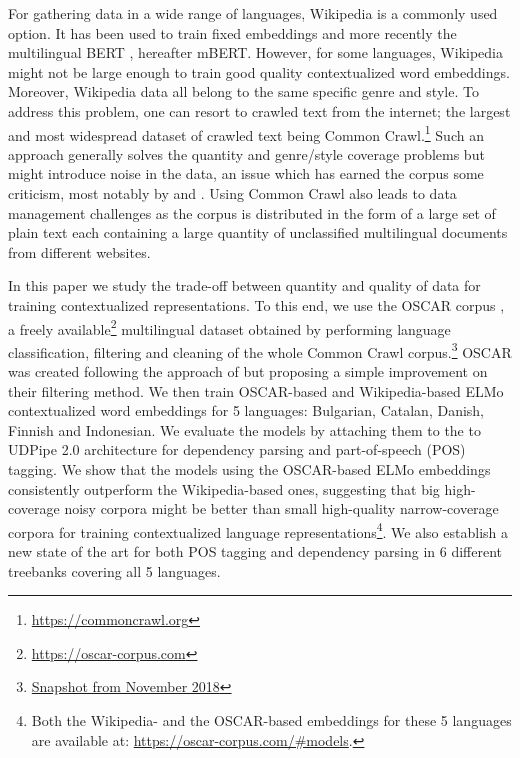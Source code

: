 For gathering data in a wide range of languages, Wikipedia is a commonly used option. It has been used to train fixed embeddings \citep{al-rfou-etal-2013-polyglot,bojanowski-etal-2017-enriching} and more recently the multilingual BERT \citep{devlin-etal-2019-bert}, hereafter mBERT. However, for some languages, Wikipedia might not be large enough to train good quality contextualized word embeddings. Moreover, Wikipedia data all belong to the same specific genre and style. To address this problem, one can resort to crawled text from the internet; the largest and most widespread dataset of crawled text being Common Crawl.\footnote{\url{https://commoncrawl.org}} Such an approach generally solves the quantity and genre/style coverage problems but might introduce noise in the data, an issue which has earned the corpus some criticism, most notably by \citet{trinh-le-2018-a} and \citet{radford-etal-2019-language}. Using Common Crawl also leads to data management challenges as the corpus is distributed in the form of a large set of plain text each containing a large quantity of unclassified multilingual documents from different websites.


In this paper we study the trade-off between quantity and quality of data for training contextualized representations. To this end, we use the OSCAR corpus \citep{ortiz-suarez-etal-2019-asynchronous}, a freely available\footnote{\url{https://oscar-corpus.com}} multilingual dataset obtained by performing language classification, filtering and cleaning of the whole Common Crawl corpus.\footnote{\href{http://commoncrawl.org/2018/11/november-2018-crawl-archive-now-available/}{Snapshot from November 2018}} OSCAR was created following the approach of \citet{grave-etal-2018-learning} but proposing a simple improvement on their filtering method. We then train OSCAR-based and Wikipedia-based ELMo contextualized word embeddings \citep{peters-etal-2018-deep} for 5 languages: Bulgarian, Catalan, Danish, Finnish and Indonesian. We evaluate the models by attaching them to the to UDPipe 2.0 architecture \citep{straka-2018-udpipe,straka-strakova-2019-evaluating} for dependency parsing and part-of-speech (POS) tagging. We show that the models using the OSCAR-based ELMo embeddings consistently outperform the Wikipedia-based ones, suggesting that big high-coverage noisy corpora might be better than small high-quality narrow-coverage corpora for training contextualized language representations\footnote{Both the Wikipedia- and the OSCAR-based embeddings for these 5 languages are available at: \url{https://oscar-corpus.com/\#models}.}. We also establish a new state of the art for both POS tagging and dependency parsing in 6 different treebanks covering all 5 languages.

